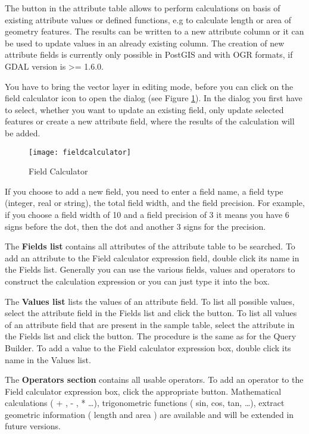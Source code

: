 The  button in the
attribute table allows to perform calculations on basis of existing
attribute values or defined functions, e.g to calculate length or area
of geometry features. The results can be written to a new attribute column
or it can be used to update values in an already existing column. The creation
of new attribute fields is currently only possible in PostGIS and with OGR
formats, if GDAL version is >= 1.6.0.

You have to bring the vector layer in editing mode, before you can click on
the field calculator icon to open the dialog (see Figure
\ref{fig:field_calculator}). In the dialog you first have to select, whether
you want to update an existing field, only update selected features or
create a new attribute field, where the results of the calculation will be added.

\begin{figure}[ht]
  \centering
    \texttt{[image: fieldcalculator]}
    \caption{Field Calculator \nixcaption}\label{fig:field_calculator}
\end{figure}

If you choose to add a new field, you need to enter a field name, a field type
(integer, real or string), the total field width, and the field precision.
For example, if you choose a field width of 10 and a field precision of 3 it
means you have 6 signs before the dot, then the dot and another 3 signs for the
precision.

The \textbf{Fields list} contains all attributes of the attribute table to be
searched. To add an attribute to the Field calculator expression field, double
click its name in the Fields list. Generally you can use the various fields,
values and operators to construct the calculation expression or you can just
type it into the box.

The \textbf{Values list} lists the values of an attribute field. To list all
possible values, select the attribute field in the Fields list and click the
 button. To list all
values of an attribute field that are present in the sample table, select the
attribute in the Fields list and click the  button. The procedure is the same as for the Query
Builder. To add a value to the Field calculator expression box, double click its
name in the Values list.

The \textbf{Operators section} contains all usable operators. To add an operator
to the Field calculator expression box, click the appropriate button. Mathematical
calculations ( + , - , * \dots), trigonometric functions ( sin, cos, tan, \dots),
extract geometric information ( length and area ) are available and will be
extended in future versions.

